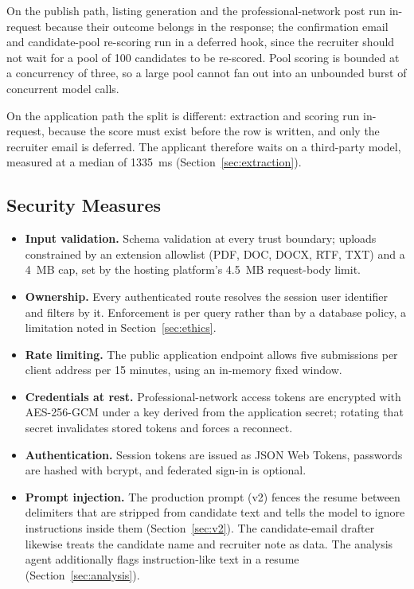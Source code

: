 \documentclass[conference]{IEEEtran}
\begin{document}
On the publish path, listing generation and the professional-network post run
in-request because their outcome belongs in the response; the confirmation email
and candidate-pool re-scoring run in a deferred hook, since the recruiter should
not wait for a pool of 100 candidates to be re-scored. Pool scoring is bounded
at a concurrency of three, so a large pool cannot fan out into an unbounded
burst of concurrent model calls.

On the application path the split is different: extraction and scoring run
in-request, because the score must exist before the row is written, and only the
recruiter email is deferred. The applicant therefore waits on a third-party
model, measured at a median of 1335~ms (Section~\ref{sec:extraction}).

\subsection{Security Measures}

\begin{itemize}
\item \textbf{Input validation.} Schema validation at every trust boundary;
uploads constrained by an extension allowlist (PDF, DOC, DOCX, RTF, TXT) and a
4~MB cap, set by the hosting platform's 4.5~MB request-body limit.
\item \textbf{Ownership.} Every authenticated route resolves the session user
identifier and filters by it. Enforcement is per query rather than by a database
policy, a limitation noted in Section~\ref{sec:ethics}.
\item \textbf{Rate limiting.} The public application endpoint allows five
submissions per client address per 15 minutes, using an in-memory fixed window.
\item \textbf{Credentials at rest.} Professional-network access tokens are
encrypted with AES-256-GCM under a key derived from the application secret;
rotating that secret invalidates stored tokens and forces a reconnect.
\item \textbf{Authentication.} Session tokens are issued as JSON Web Tokens,
passwords are hashed with bcrypt, and federated sign-in is optional.
\item \textbf{Prompt injection.} The production prompt (v2) fences the resume
between delimiters that are stripped from candidate text and tells the model to
ignore instructions inside them (Section~\ref{sec:v2}). The candidate-email
drafter likewise treats the candidate name and recruiter note as data. The
analysis agent additionally flags instruction-like text in a resume
(Section~\ref{sec:analysis}).
\end{itemize}
\end{document}
